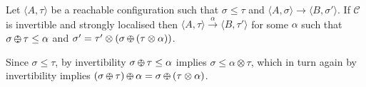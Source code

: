 \documentclass{llncs}
\def\C{{\mathcal C}}
\def\C{{\mathcal C}}
\def\odiv{\, {\ominus\hspace{-7.7pt} \div} \,}
\begin{document}
\begin{theorem}[Completeness]
Let $\langle A, \tau \rangle$ be a reachable configuration such that
$\sigma \leq \tau$ and
$\langle A, \sigma \rangle \to \langle B, \sigma' \rangle$. 
If $\C$ is invertible and strongly localised then 
$\langle A, \tau \rangle \xrightarrow{\alpha} \langle B, \tau' \rangle$
for some $\alpha$ such that $\sigma \odiv \tau \leq \alpha$
and $\sigma' = \tau' \otimes (\sigma \odiv (\tau \otimes \alpha))$.
\end{theorem}

Since $\sigma \leq \tau$, by invertibility $\sigma \odiv \tau \leq \alpha$ implies $\sigma \leq \alpha \otimes \tau$,
which in turn again by invertibility implies $(\sigma \odiv \tau) \odiv \alpha = \sigma \odiv (\tau \otimes \alpha)$. 
\end{document}
